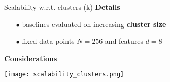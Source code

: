 		\begin{frame}[allowframebreaks]{Scalability w.r.t. clusters (k)}
			\textbf{Details}
			\begin{itemize}
				\item[$\bullet$] baselines evaluated on increasing \textbf{cluster size}
				\item[$\bullet$] fixed data points $N=256$ and features $d=8$
			\end{itemize} 

			\textbf{Considerations}
			\begin{table}[]
			\end{table}

			\begin{center}
				\texttt{[image: scalability\_clusters.png]}
			\end{center}
		\end{frame}

